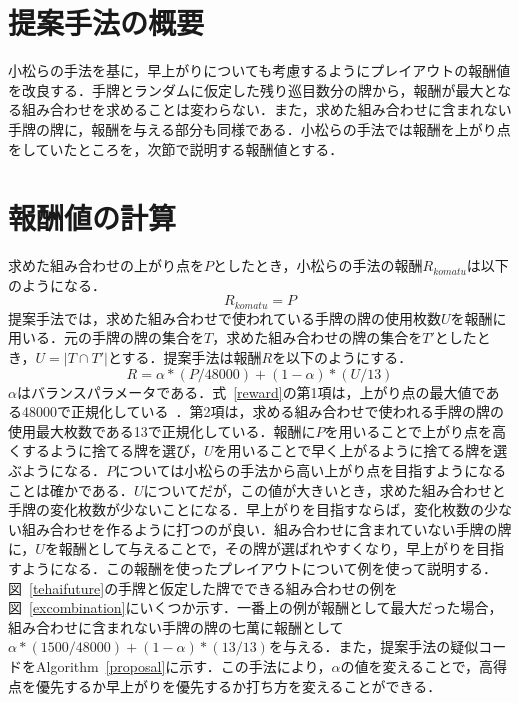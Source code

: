 \section{提案手法の概要}
小松らの手法を基に，早上がりについても考慮するようにプレイアウトの報酬値を改良する．手牌とランダムに仮定した残り巡目数分の牌から，報酬が最大となる組み合わせを求めることは変わらない．また，求めた組み合わせに含まれない手牌の牌に，報酬を与える部分も同様である．小松らの手法では報酬を上がり点をしていたところを，次節で説明する報酬値とする．
\section{報酬値の計算}
求めた組み合わせの上がり点を$P$としたとき，小松らの手法の報酬$R_{komatu}$は以下のようになる．
\begin{equation*}
R_{komatu}=P
\end{equation*}
提案手法では，求めた組み合わせで使われている手牌の牌の使用枚数$U$を報酬に用いる．元の手牌の牌の集合を$T$，求めた組み合わせの牌の集合を$T'$としたとき，$U=|T \cap T'|$とする．提案手法は報酬$R$を以下のようにする．
\begin{equation}
R=\alpha*(P/48000)+(1-\alpha)*(U/13)
\label{reward}
\end{equation}
$\alpha$はバランスパラメータである．式~\ref{reward}の第1項は，上がり点の最大値である48000で正規化している~\cite{point}．第2項は，求める組み合わせで使われる手牌の牌の使用最大枚数である13で正規化している．報酬に$P$を用いることで上がり点を高くするように捨てる牌を選び，$U$を用いることで早く上がるように捨てる牌を選ぶようになる．$P$については小松らの手法から高い上がり点を目指すようになることは確かである．$U$についてだが，この値が大きいとき，求めた組み合わせと手牌の変化枚数が少ないことになる．早上がりを目指すならば，変化枚数の少ない組み合わせを作るように打つのが良い．組み合わせに含まれていない手牌の牌に，$U$を報酬として与えることで，その牌が選ばれやすくなり，早上がりを目指すようになる．この報酬を使ったプレイアウトについて例を使って説明する．図~\ref{tehaifuture}の手牌と仮定した牌でできる組み合わせの例を図~\ref{excombination}にいくつか示す．一番上の例が報酬として最大だった場合，組み合わせに含まれない手牌の牌の七萬に報酬として$\alpha*(1500/48000)+(1-\alpha)*(13/13)$を与える．また，提案手法の疑似コードをAlgorithm~\ref{proposal}に示す．この手法により，$\alpha$の値を変えることで，高得点を優先するか早上がりを優先するか打ち方を変えることができる．

